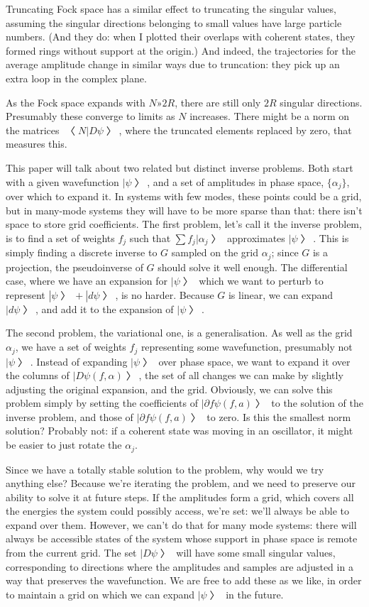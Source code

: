 Truncating Fock space has a similar effect to truncating the singular values, assuming the singular directions belonging to small values have large particle numbers.  (And they do: when I plotted their overlaps with coherent states, they formed rings without support at the origin.)  And indeed, the trajectories for the average amplitude change in similar ways due to truncation: they pick up an extra loop in the complex plane.

As the Fock space expands with $N»2R$, there are still only $2R$ singular directions.  Presumably these converge to limits as $N$ increases.  There might be a norm on the matrices $〈N|Dψ〉$, where the truncated elements replaced by zero, that measures this.


This paper will talk about two related but distinct inverse problems.  Both start with a given wavefunction $|ψ〉$, and a set of amplitudes in phase space, $\{α_j\}$, over which to expand it.  In systems with few modes, these points could be a grid, but in many-mode systems they will have to be more sparse than that: there isn't space to store grid coefficients.  The first problem, let's call it the inverse problem, is to find a set of weights $f_j$ such that $∑f_j|α_j〉$ approximates $|ψ〉$.  This is simply finding a discrete inverse to $G$ sampled on the grid $α_j$; since $G$ is a projection, the pseudoinverse of $G$ should solve it well enough.  The differential case, where we have an expansion for $|ψ〉$ which we want to perturb to represent $|ψ〉+|dψ〉$, is no harder.  Because $G$ is linear, we can expand $|dψ〉$, and add it to the expansion of $|ψ〉$.

The second problem, the variational one, is a generalisation.  As well as the grid $α_j$, we have a set of weights $f_j$ representing some wavefunction, presumably not $|ψ〉$.  Instead of expanding $|ψ〉$ over phase space, we want to expand it over the columns of $|Dψ(f,α)〉$, the set of all changes we can make by slightly adjusting the original expansion, and the grid.  Obviously, we can solve this problem simply by setting the coefficients of $|∂fψ(f,a)〉$ to the solution of the inverse problem, and those of $|∂fψ(f,a)〉$ to zero.  Is this the smallest norm solution?  Probably not: if a coherent state was moving in an oscillator, it might be easier to just rotate the $α_j$.

Since we have a totally stable solution to the problem, why would we try anything else?  Because we're iterating the problem, and we need to preserve our ability to solve it at future steps.  If the amplitudes form a grid, which covers all the energies the system could possibly access, we're set: we'll always be able to expand over them.  However, we can't do that for many mode systems: there will always be accessible states of the system whose support in phase space is remote from the current grid.  The set $|Dψ〉$ will have some small singular values, corresponding to directions where the amplitudes and samples are adjusted in a way that preserves the wavefunction.  We are free to add these as we like, in order to maintain a grid on which we can expand $|ψ〉$ in the future.

